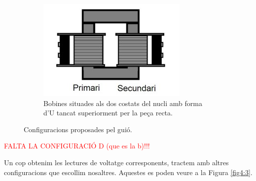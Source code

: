 \documentclass[a4paper,10.5pt]{report}
\begin{document}
\begin{figure}[h]
\begin{subfigure}[b]{0.25\textwidth}
		\label{fig4:2b}
	\end{subfigure}
	\hspace{0.5cm}
	\begin{subfigure}[b]{0.25\textwidth}
		\centering
		\includegraphics[width=\textwidth]{42c.jpg}
		\caption{Bobines situades als dos costats del nucli amb forma d'U tancat superiorment per la peça recta.}
		\label{fig4:2c}
	\end{subfigure}
	\caption{Configuracions proposades pel guió.}
	\label{fig4:2}
\end{figure}

\textcolor{red}{FALTA LA CONFIGURACIÓ D (que es la b)!!!}

Un cop obtenim les lectures de voltatge corresponents, tractem amb altres configuracions que escollim nosaltres. Aquestes es poden veure a la Figura \ref{fig4:3}.
\end{document}
